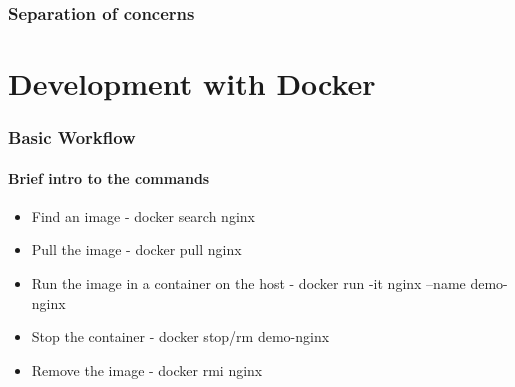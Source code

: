 \documentclass[mathserif,serif]{beamer}
\begin{document}
    \begin{frame}
        \frametitle{Separation of concerns}
        \begin{center}
        \end{center}
    \end{frame}


    \section{Development with Docker}\label{sec:developmentWithDocker}
    \begin{frame}
        \frametitle{Basic Workflow}
        \framesubtitle{Brief intro to the commands}
        \begin{itemize}[<+->]
            \item Find an image - docker search nginx
             {}
            \item Pull the image - docker pull nginx
            \item Run the image in a container on the host - docker run -it nginx --name demo-nginx
            \item Stop the container - docker stop/rm demo-nginx
            \item Remove the image - docker rmi nginx
        \end{itemize}
    \end{frame}
\end{document}
